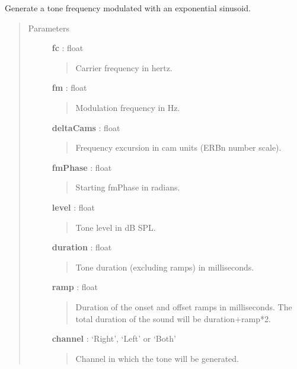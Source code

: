 \documentclass[a4paper,12pt,english]{sphinxmanual}
\begin{document}
\begin{fulllineitems}
\label{sndlib:sndlib.camSinFMComplex}
Generate a tone frequency modulated with an exponential sinusoid.
\begin{quote}\begin{description}
\item[{Parameters }] \leavevmode
\textbf{fc} : float
\begin{quote}

Carrier frequency in hertz.
\end{quote}

\textbf{fm} : float
\begin{quote}

Modulation frequency in Hz.
\end{quote}

\textbf{deltaCams} : float
\begin{quote}

Frequency excursion in cam units (ERBn number scale).
\end{quote}

\textbf{fmPhase} : float
\begin{quote}

Starting fmPhase in radians.
\end{quote}

\textbf{level} : float
\begin{quote}

Tone level in dB SPL.
\end{quote}

\textbf{duration} : float
\begin{quote}

Tone duration (excluding ramps) in milliseconds.
\end{quote}

\textbf{ramp} : float
\begin{quote}

Duration of the onset and offset ramps in milliseconds.
The total duration of the sound will be duration+ramp*2.
\end{quote}

\textbf{channel} : `Right', `Left' or `Both'
\begin{quote}

Channel in which the tone will be generated.
\end{quote}


\end{description}
\end{quote}
\end{fulllineitems}
\end{document}
